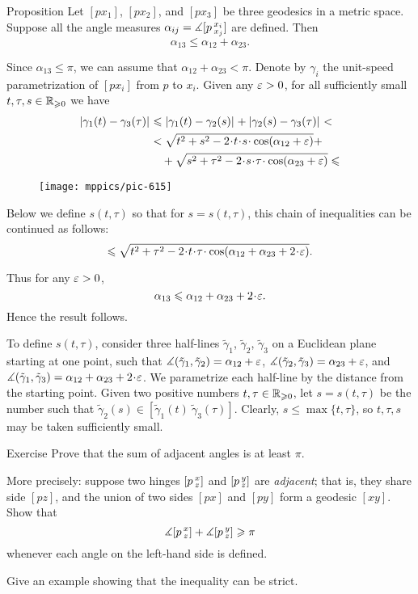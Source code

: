 \begin{thm}{Proposition}\label{claim:angle-3angle-inq}
Let  $[px_1]$, $[px_2]$, and $[px_3]$ be three geodesics in a metric space.
Suppose all the angle measures $\alpha_{i j}=\measuredangle[p\,{}^{x_i}_{x_j}]$ are defined.
Then 
\[\alpha_{13}\le \alpha_{12}+\alpha_{23}.\]

\end{thm}



Since $\alpha_{13}\le\pi$, we can assume that $\alpha_{12}+\alpha_{23}< \pi$.
Denote by $\gamma_i$ the unit-speed parametrization of $[px_i]$ from $p$ to $x_i$.
Given any $\varepsilon>0$, for all sufficiently small $t,\tau,s\in\mathbb{R}_{\geqslant0}$ we have
\begin{align*}
\dist{\gamma_1(t)}{\gamma_3(\tau)}{}
&\le 
\dist{\gamma_1(t)}{\gamma_2(s)}{}+\dist{\gamma_2(s)}{\gamma_3(\tau)}{}<\\
&<
\sqrt{t^2+s^2-2\cdot t\cdot  s\cdot \cos(\alpha_{12}+\eps)} +
\\
&\quad+\sqrt{s^2+\tau^2-2\cdot s\cdot \tau\cdot \cos(\alpha_{23}+\eps)}\le
\end{align*}

\begin{wrapfigure}{o}{30 mm}
\vskip-6mm
\centering
\texttt{[image: mppics/pic-615]}
\vskip6mm
\end{wrapfigure}

Below we define 
$s(t,\tau)$ so that for 
$s=s(t,\tau)$, this chain of inequalities can be continued as follows:
\[\le
\sqrt{t^2+\tau^2-2\cdot t\cdot \tau\cdot \cos(\alpha_{12}+\alpha_{23}+2\cdot \eps)}.
\]

Thus for any $\varepsilon>0$, 
\[\alpha_{13}\le \alpha_{12}+\alpha_{23}+2\cdot \eps.\]
Hence the result follows.

To define $s(t,\tau)$, consider three half-lines $\tilde \gamma_1$, $\tilde \gamma_2$, $\tilde \gamma_3$ on a Euclidean plane starting at one point, such that
$\measuredangle(\tilde \gamma_1,\tilde \gamma_2)=\alpha_{12}+\varepsilon$,
$\measuredangle(\tilde \gamma_2,\tilde \gamma_3)=\alpha_{23}+\varepsilon$,
and $\mangle(\tilde \gamma_1,\tilde \gamma_3)\z=\alpha_{12}\z+\alpha_{23}\z+2\cdot \eps$.
We parametrize each half-line by the distance from the starting point.
Given two positive numbers $t,\tau\in\mathbb{R}_{\geqslant0}$, let $s=s(t,\tau)$ be 
the number such that 
$\tilde \gamma_2(s)\in[\tilde \gamma_1(t)\ \tilde \gamma_3(\tau)]$. 
Clearly, $s\le\max\{t,\tau\}$, so $t,\tau,s$ may be taken sufficiently small.
\qeds 

\begin{thm}{Exercise}\label{ex:adjacent-angles}
Prove that the sum of adjacent angles is at least $\pi$.

More precisely: suppose two hinges $[p\,{}^{x}_{z}]$ and $[p\,{}^{y}_{z}]$ are \emph{adjacent};
that is, they share side $[pz]$, and the union of two sides $[px]$ and $[py]$ form a geodesic $[xy]$.
Show that
\[\measuredangle[p\,{}^{x}_{z}]+\measuredangle[p\,{}^{y}_{z}]\geqslant \pi\]
whenever  each angle on the left-hand side is defined.

Give an example showing that the inequality can be strict.
\end{thm}

